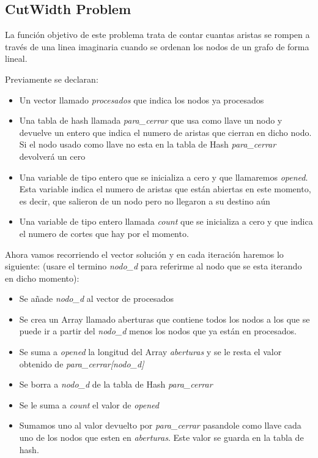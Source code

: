 \documentclass[12pt,a4paper,draft,openany]{article}
\begin{document}
\subsection{CutWidth Problem}
La función objetivo de este problema trata de contar cuantas aristas se rompen a través de una
linea imaginaria cuando se ordenan los nodos de un grafo de forma lineal. 

Previamente se declaran:
\begin{itemize}
\item Un vector llamado \emph{procesados} que indica los nodos ya procesados
\item Una tabla de hash llamada \emph{para\_cerrar} que usa como llave un nodo y devuelve un entero que indica el numero de aristas que cierran en dicho nodo. Si el nodo usado como llave no esta en la tabla de Hash \emph{para\_cerrar} devolverá un cero
\item Una variable de tipo entero que se inicializa a cero y que llamaremos \emph{opened}. Esta variable indica el numero de aristas que están abiertas en este momento, es decir, que salieron de un nodo pero no llegaron a su destino aún
\item Una variable de tipo entero llamada \emph{count} que se inicializa a cero y que indica el numero de cortes que hay por el momento.
\end{itemize}

Ahora vamos recorriendo el vector solución y en cada iteración haremos lo siguiente: (usare el termino \emph{nodo\_d} para referirme al nodo que se esta iterando en dicho momento):

\begin{itemize}
\item Se añade \emph{nodo\_d} al vector de procesados
\item Se crea un Array llamado aberturas que contiene todos los nodos a los que se puede ir a partir del \emph{nodo\_d} menos los nodos que ya están en procesados.
\item Se suma a \emph{opened} la longitud del Array \emph{aberturas} y se le resta el valor obtenido de \emph{para\_cerrar[nodo\_d]}
\item Se borra a \emph{nodo\_d} de la tabla de Hash \emph{para\_cerrar}
\item Se le suma a \emph{count} el valor de \emph{opened}
\item Sumamos uno al valor devuelto por \emph{para\_cerrar} pasandole como llave cada uno de los nodos que esten en \emph{aberturas}. Este valor se guarda en la tabla de hash.
\end{itemize}
\end{document}
